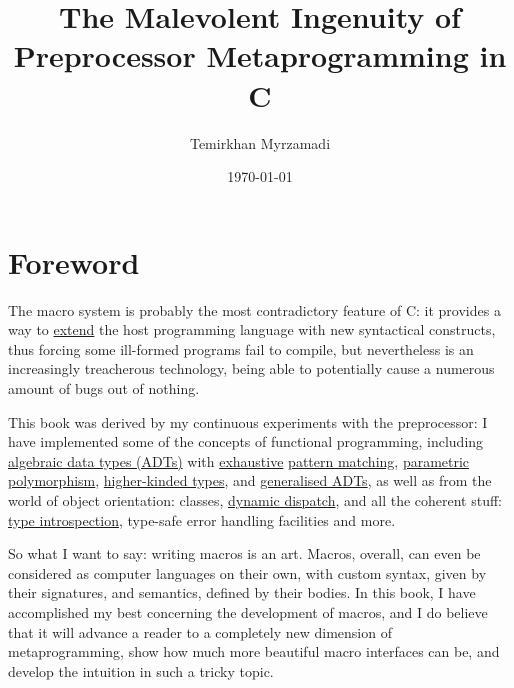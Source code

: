 \documentclass[a4paper, 12pt]{book}
\begin{document}
\title{The Malevolent Ingenuity of Preprocessor Metaprogramming in C}
\author{Temirkhan Myrzamadi}
\date{\today}
\maketitle

\tableofcontents

\newpage

\section{Foreword}

The macro system is probably the most contradictory feature of C: it provides a way to
\href{https://en.wikipedia.org/wiki/Extensible_programming}{extend} the host programming
language with new syntactical constructs, thus forcing some ill-formed programs fail
to compile, but nevertheless is an increasingly treacherous technology, being able to
potentially cause a numerous amount of bugs out of nothing.

This book was derived by my continuous experiments with the preprocessor: I have implemented
some of the concepts of functional programming, including
\href{https://en.wikipedia.org/wiki/Algebraic_data_type}{algebraic data types (ADTs)} with
\href{https://en.wikipedia.org/wiki/Proof_by_exhaustion}{exhaustive}
\href{https://en.wikipedia.org/wiki/Pattern_matching}{pattern matching},
\href{https://en.wikipedia.org/wiki/Parametric_polymorphism}{parametric polymorphism},
\href{https://en.wikipedia.org/wiki/Kind_(type_theory)}{higher-kinded types}, and
\href{https://en.wikipedia.org/wiki/Generalized_algebraic_data_type}{generalised ADTs}, as
well as from the world of object orientation: classes,
\href{https://en.wikipedia.org/wiki/Dynamic_dispatch}{dynamic dispatch}, and all the coherent
stuff: \href{https://en.wikipedia.org/wiki/Type_introspection}{type introspection}, type-safe
error handling facilities and more.

So what I want to say: writing macros is an art. Macros, overall, can even be considered as
computer languages on their own, with custom syntax, given by their signatures, and
semantics, defined by their bodies. In this book, I have accomplished my best concerning
the development of macros, and I do believe that it will advance a reader to a completely
new dimension of metaprogramming, show how much more beautiful macro interfaces can be, and
develop the intuition in such a tricky topic.

\newpage
\end{document}
